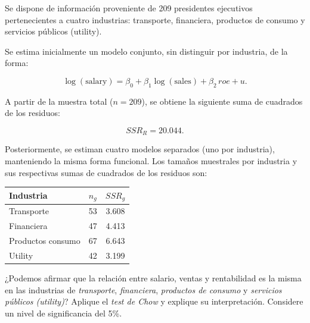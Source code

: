 \documentclass[10pt,a4paper]{article}
\begin{document}
\begin{enumerate}
Se dispone de información proveniente de 209 presidentes ejecutivos pertenecientes a cuatro 
industrias: transporte, financiera, productos de consumo y servicios públicos (utility).

Se estima inicialmente un modelo conjunto, sin distinguir por industria, de la forma:

\[
\log(\text{salary}) = \beta_0 + \beta_1 \log(\text{sales}) + \beta_2 \, roe + u.
\]

A partir de la muestra total ($n = 209$), se obtiene la siguiente suma de cuadrados de los residuos:

\[
SSR_R = 20.044.
\]

Posteriormente, se estiman cuatro modelos separados (uno por industria), manteniendo la misma 
forma funcional. Los tamaños muestrales por industria y sus respectivas sumas de cuadrados de los 
residuos son:

\begin{center}
\begin{tabular}{|l|c|c|}
\hline
\textbf{Industria} & $n_g$ & $SSR_g$ \\
\hline
Transporte        & 53 & 3.608 \\
Financiera        & 47 & 4.413 \\
Productos consumo & 67 & 6.643 \\
Utility           & 42 & 3.199 \\
\hline

\end{tabular}
\end{center}

\vspace{0.5cm}

¿Podemos afirmar que la relación entre salario, ventas y rentabilidad es la misma en las 
industrias de \textit{transporte}, \textit{financiera}, \textit{productos de consumo} y 
\textit{servicios públicos (utility)}? 
Aplique el \textit{test de Chow} y explique 
su interpretación. Considere un nivel de significancia del 5\%.

 
\end{enumerate}

\newpage
\end{document}
